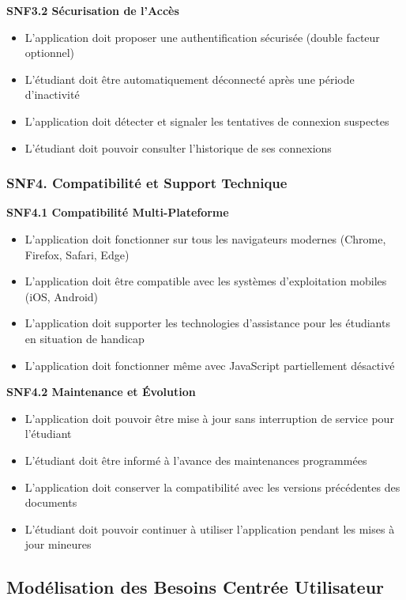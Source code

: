 \documentclass[12pt,a4paper]{report}
\begin{document}
\textbf{SNF3.2 Sécurisation de l'Accès}
\begin{itemize}
\item L'application doit proposer une authentification sécurisée (double facteur optionnel)
\item L'étudiant doit être automatiquement déconnecté après une période d'inactivité
\item L'application doit détecter et signaler les tentatives de connexion suspectes
\item L'étudiant doit pouvoir consulter l'historique de ses connexions
\end{itemize}

\subsubsection{SNF4. Compatibilité et Support Technique}

\textbf{SNF4.1 Compatibilité Multi-Plateforme}
\begin{itemize}
\item L'application doit fonctionner sur tous les navigateurs modernes (Chrome, Firefox, Safari, Edge)
\item L'application doit être compatible avec les systèmes d'exploitation mobiles (iOS, Android)
\item L'application doit supporter les technologies d'assistance pour les étudiants en situation de handicap
\item L'application doit fonctionner même avec JavaScript partiellement désactivé
\end{itemize}

\textbf{SNF4.2 Maintenance et Évolution}
\begin{itemize}
\item L'application doit pouvoir être mise à jour sans interruption de service pour l'étudiant
\item L'étudiant doit être informé à l'avance des maintenances programmées
\item L'application doit conserver la compatibilité avec les versions précédentes des documents
\item L'étudiant doit pouvoir continuer à utiliser l'application pendant les mises à jour mineures
\end{itemize}

\subsection{Modélisation des Besoins Centrée Utilisateur}
\end{document}
